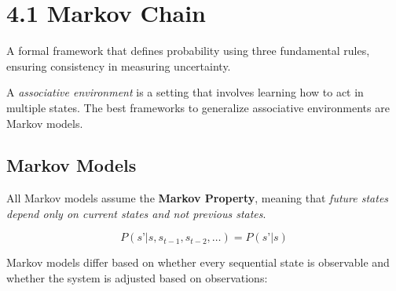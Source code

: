 \documentclass[
  letterpaper,
  DIV=11,
  numbers=noendperiod]{scrreprt}
\begin{document}
\chapter{4.1 Markov Chain}\label{markov-chain}

\begin{tcolorbox}[enhanced jigsaw, colback=white, left=2mm, breakable, opacityback=0, bottomrule=.15mm, rightrule=.15mm, arc=.35mm, colframe=quarto-callout-note-color-frame, leftrule=.75mm, toprule=.15mm]

A formal framework that defines probability using three fundamental
rules, ensuring consistency in measuring uncertainty. 🎲

\end{tcolorbox}

\begin{tcolorbox}[enhanced jigsaw, opacityback=0, left=2mm, breakable, bottomtitle=1mm, rightrule=.15mm, colframe=quarto-callout-tip-color-frame, titlerule=0mm, colback=white, opacitybacktitle=0.6, toptitle=1mm, title=\textcolor{quarto-callout-tip-color}{\faLightbulb}\hspace{0.5em}{Associative Environments}, colbacktitle=quarto-callout-tip-color!10!white, bottomrule=.15mm, arc=.35mm, coltitle=black, leftrule=.75mm, toprule=.15mm]

A \emph{associative environment} is a setting that involves learning how
to act in multiple states. The best frameworks to generalize associative
environments are Markov models.

\end{tcolorbox}

\section{Markov Models}\label{markov-models}

All Markov models assume the \textbf{Markov Property}, meaning that
\emph{future states depend only on current states and not previous
states}.

\[
P(s’ | s, s_{t-1}, s_{t-2}, \dots) = P(s’ | s)
\]

Markov models differ based on whether every sequential state is
observable and whether the system is adjusted based on observations:
\end{document}
